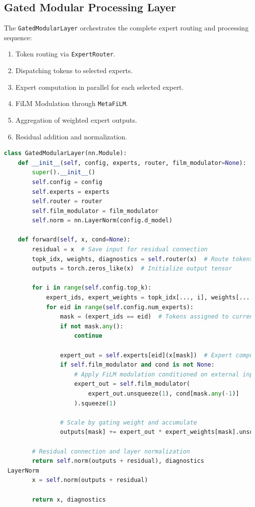\documentclass{article}
\begin{document}
\subsection{Gated Modular Processing Layer}
The \texttt{GatedModularLayer} orchestrates the complete expert routing and processing sequence:
\begin{enumerate}
    \item Token routing via \texttt{ExpertRouter}.
    \item Dispatching tokens to selected experts.
    \item Expert computation in parallel for each selected expert.
    \item FiLM Modulation through \texttt{MetaFiLM}.
    \item Aggregation of weighted expert outputs.
    \item Residual addition and normalization.
\end{enumerate}

\vspace{3pt}
\begin{lstlisting}[language=Python, caption=GML module, label={lst:gml}]
class GatedModularLayer(nn.Module):
    def __init__(self, config, experts, router, film_modulator=None):
        super().__init__()
        self.config = config
        self.experts = experts
        self.router = router
        self.film_modulator = film_modulator
        self.norm = nn.LayerNorm(config.d_model)

    def forward(self, x, cond=None):
        residual = x  # Save input for residual connection
        topk_idx, weights, diagnostics = self.router(x)  # Route tokens to experts
        outputs = torch.zeros_like(x)  # Initialize output tensor

        for i in range(self.config.top_k):
            expert_ids, expert_weights = topk_idx[..., i], weights[..., i]
            for eid in range(self.config.num_experts):
                mask = (expert_ids == eid)  # Tokens assigned to current expert
                if not mask.any():
                    continue

                expert_out = self.experts[eid](x[mask])  # Expert computation
                if self.film_modulator and cond is not None:
                    # Apply FiLM modulation conditioned on external input
                    expert_out = self.film_modulator(
                        expert_out.unsqueeze(1), cond[mask.any(-1)]
                    ).squeeze(1)

                # Scale by gating weight and accumulate
                outputs[mask] += expert_out * expert_weights[mask].unsqueeze(-1)

        # Residual connection and layer normalization
        return self.norm(outputs + residual), diagnostics
 LayerNorm
        x = self.norm(outputs + residual)

        return x, diagnostics

\end{lstlisting}
\end{document}
